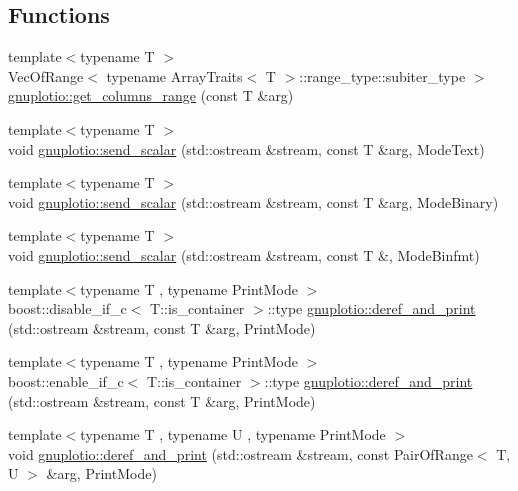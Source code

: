 \subsection*{Functions}
\begin{DoxyCompactItemize}
\item 
{\footnotesize template$<$typename T $>$ }\\Vec\+Of\+Range$<$ typename Array\+Traits$<$ T $>$\+::range\+\_\+type\+::subiter\+\_\+type $>$ \hyperlink{namespacegnuplotio_a64984827dd8debb9098ad1afdde8e409}{gnuplotio\+::get\+\_\+columns\+\_\+range} (const T \&arg)
\item 
{\footnotesize template$<$typename T $>$ }\\void \hyperlink{namespacegnuplotio_a55ff2f9abaa4b3e1c64a8f730f791b33}{gnuplotio\+::send\+\_\+scalar} (std\+::ostream \&stream, const T \&arg, Mode\+Text)
\item 
{\footnotesize template$<$typename T $>$ }\\void \hyperlink{namespacegnuplotio_a05022d6e136d8ed89a2bef0f61443332}{gnuplotio\+::send\+\_\+scalar} (std\+::ostream \&stream, const T \&arg, Mode\+Binary)
\item 
{\footnotesize template$<$typename T $>$ }\\void \hyperlink{namespacegnuplotio_a926e0935a02d83735da2c34cfbad133f}{gnuplotio\+::send\+\_\+scalar} (std\+::ostream \&stream, const T \&, Mode\+Binfmt)
\item 
{\footnotesize template$<$typename T , typename Print\+Mode $>$ }\\boost\+::disable\+\_\+if\+\_\+c$<$ T\+::is\+\_\+container $>$\+::type \hyperlink{namespacegnuplotio_a66d64f716e539dc233f8183b4ce71c09}{gnuplotio\+::deref\+\_\+and\+\_\+print} (std\+::ostream \&stream, const T \&arg, Print\+Mode)
\item 
{\footnotesize template$<$typename T , typename Print\+Mode $>$ }\\boost\+::enable\+\_\+if\+\_\+c$<$ T\+::is\+\_\+container $>$\+::type \hyperlink{namespacegnuplotio_a8c6b699dd18c419d597a008b74eda41a}{gnuplotio\+::deref\+\_\+and\+\_\+print} (std\+::ostream \&stream, const T \&arg, Print\+Mode)
\item 
{\footnotesize template$<$typename T , typename U , typename Print\+Mode $>$ }\\void \hyperlink{namespacegnuplotio_acd0cb4bd9679f0b75bac15c8afcc10e6}{gnuplotio\+::deref\+\_\+and\+\_\+print} (std\+::ostream \&stream, const Pair\+Of\+Range$<$ T, U $>$ \&arg, Print\+Mode)
\item 

\end{DoxyCompactItemize}
